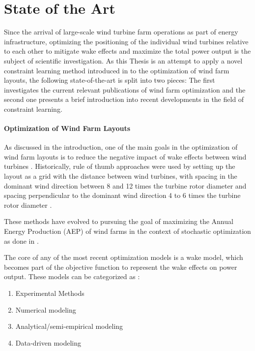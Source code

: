 
\chapter{State of the Art}\label{chapter:state_of_the_art}

Since the arrival of large-scale wind turbine farm operations as part of energy infrastructure, optimizing the positioning of the individual wind turbines relative to each other to mitigate wake effects and maximize the total power output is the subject of scientific investigation. As this Thesis is an attempt to apply a novel constraint learning method introduced in \cite{ALCANTARA2023120895} to the optimization of wind farm layouts, the following state-of-the-art is split into two pieces:  The first investigates the current relevant publications of wind farm optimization and the second one presents a brief introduction into recent developments in the field of constraint learning. 

\subsubsection{Optimization of Wind Farm Layouts}

As discussed in the introduction, one of the main goals in the optimization of wind farm layouts is to reduce the negative impact of wake effects between wind turbines \cite{KIM2024123383}. Historically, rule of thumb approaches were used by setting up the layout as a grid  with the distance between wind turbines, with spacing in the dominant wind direction between 8 and 12 times the turbine rotor diameter and spacing perpendicular to the dominant wind direction 4 to 6 times the turbine rotor diameter \cite{AZLAN2021110047,hou_review_2019}.

These methods have evolved to pursuing the goal of maximizing the Annual Energy Production (AEP) of wind farms in the context of stochastic optimization as done in \cite{Sinner_2024,KIM2024123383}. 

The core of any of the most recent optimization models is a wake model, which becomes part of the objective function to represent the wake effects on power output. These models can be categorized as \cite{WANG2024118508}: 

\begin{enumerate}
	\item Experimental Methods
	\item Numerical modeling
	\item Analytical/semi-empirical modeling
	\item Data-driven modeling
\end{enumerate}

